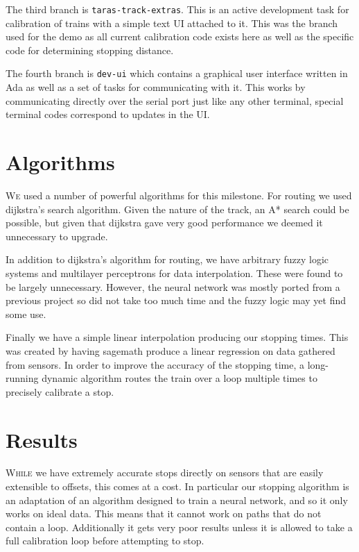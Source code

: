 \documentclass{amsart}
\begin{document}
The third branch is \texttt{taras-track-extras}. This is an active development
task for calibration of trains with a simple text UI attached to it. This was
the branch used for the demo as all current calibration code exists here as well
as the specific code for determining stopping distance.

The fourth branch is \texttt{dev-ui} which contains a graphical user interface
written in Ada as well as a set of tasks for communicating with it. This works
by communicating directly over the serial port just like any other terminal,
special terminal codes correspond to updates in the UI.

\section*{Algorithms}

\textsc{We} used a number of powerful algorithms for this milestone. For routing
we used dijkstra's search algorithm. Given the nature of the track, an A* search
could be possible, but given that dijkstra gave very good performance we deemed
it unnecessary to upgrade.

In addition to dijkstra's algorithm for routing, we have arbitrary fuzzy logic
systems and multilayer perceptrons for data interpolation. These were found to
be largely unnecessary. However, the neural network was mostly ported from a
previous project so did not take too much time and the fuzzy logic may yet find
some use.

Finally we have a simple linear interpolation producing our stopping times. This
was created by having sagemath produce a linear regression on data gathered from
sensors. In order to improve the accuracy of the stopping time, a long-running
dynamic algorithm routes the train over a loop multiple times to precisely
calibrate a stop.

\section*{Results}

\textsc{While} we have extremely accurate stops directly on sensors that are easily
extensible to offsets, this comes at a cost. In particular our stopping
algorithm is an adaptation of an algorithm designed to train a neural network,
and so it only works on ideal data. This means that it cannot work on paths that
do not contain a loop. Additionally it gets very poor results unless it is
allowed to take a full calibration loop before attempting to stop.
\end{document}
